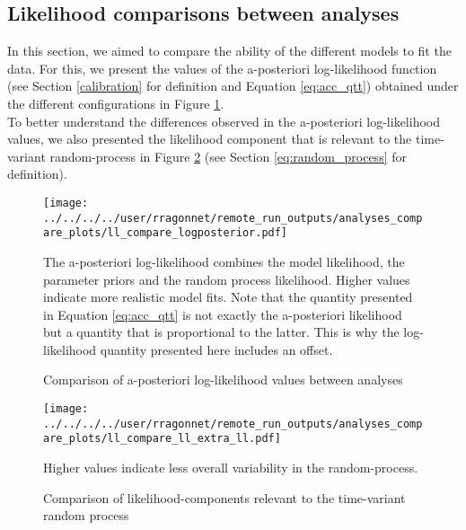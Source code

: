 \subsection{Likelihood comparisons between analyses}

In this section, we aimed to compare the ability of the different models to fit the data. For this, we present the values of the a-posteriori log-likelihood
function (see Section \ref{calibration} for definition and Equation \ref{eq:acc_qtt}) obtained under the different configurations in Figure \ref{fig:compare_likelihood}.\\

To better understand the differences observed in the a-posteriori log-likelihood values, we also presented the likelihood component that is 
relevant to the time-variant random-process in Figure \ref{fig:compare_rp_likelihood} (see Section \ref{eq:random_process} for definition).

\begin{figure}[!ht]
    \begin{center}
    \texttt{[image: ../../../../user/rragonnet/remote\_run\_outputs/analyses\_compare\_plots/ll\_compare\_logposterior.pdf]}
    \end{center}
    \caption{Comparison of a-posteriori log-likelihood values between analyses} 
    The a-posteriori log-likelihood combines the model likelihood, the parameter priors and the random process likelihood. Higher values indicate 
    more realistic model fits. Note that the quantity presented in Equation \ref{eq:acc_qtt} is not exactly the a-posteriori likelihood but a quantity that
    is proportional to the latter. This is why the log-likelihood quantity presented here includes an offset.
    \label{fig:compare_likelihood}
\end{figure}


\begin{figure}[!ht]
    \begin{center}
    \texttt{[image: ../../../../user/rragonnet/remote\_run\_outputs/analyses\_compare\_plots/ll\_compare\_ll\_extra\_ll.pdf]}
    \end{center}
    \caption{Comparison of likelihood-components relevant to the time-variant random process} 
    Higher values indicate less overall variability in the random-process.
    \label{fig:compare_rp_likelihood}
\end{figure}



\clearpage
\newpage
